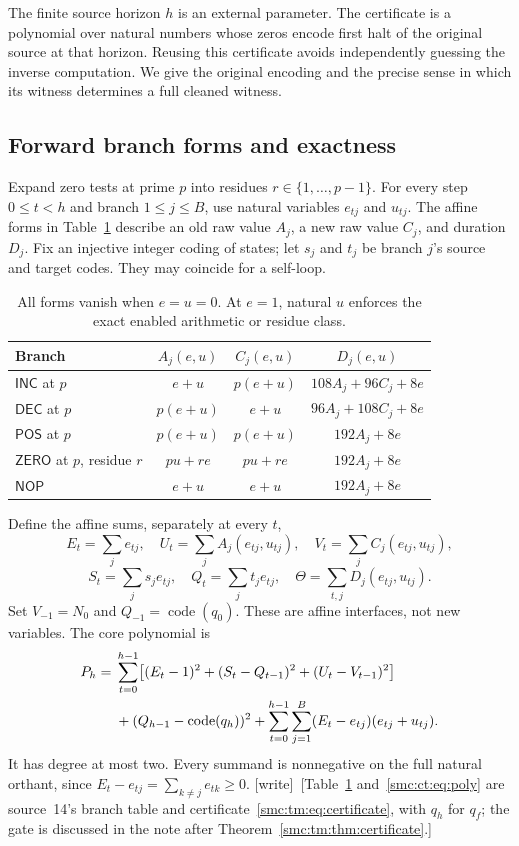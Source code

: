 \documentclass[11pt,letterpaper]{article}
\numberwithin{equation}{section}
\theoremstyle{definition}
\theoremstyle{remark}
\newcommand{\wtag}{\textup{[write]}}
\newcommand{\INC}{\mathsf{INC}}\newcommand{\DEC}{\mathsf{DEC}}\newcommand{\NOP}{\mathsf{NOP}}\newcommand{\ZERO}{\mathsf{ZERO}}\newcommand{\POS}{\mathsf{POS}}
\begin{document}
The finite source horizon $h$ is an external parameter. The certificate is a polynomial over natural numbers whose zeros encode first halt of the original source at that horizon. Reusing this certificate avoids independently guessing the inverse computation. We give the original encoding and the precise sense in which its witness determines a full cleaned witness.

\subsection{Forward branch forms and exactness}

Expand zero tests at prime $p$ into residues $r\in\{1,\ldots,p-1\}$. For every step $0\le t<h$ and branch $1\le j\le B$, use natural variables $e_{tj}$ and $u_{tj}$. The affine forms in Table~\ref{smc:ct:tab:branches} describe an old raw value $A_j$, a new raw value $C_j$, and duration $D_j$. Fix an injective integer coding of states; let $s_j$ and $t_j$ be branch $j$'s source and target codes. They may coincide for a self-loop.

\begin{table}[htbp]
\centering\small
\begin{tabular}{@{}lccc@{}}
\toprule
Branch & $A_j(e,u)$ & $C_j(e,u)$ & $D_j(e,u)$\\
\midrule
$\INC$ at $p$ & $e+u$ & $p(e+u)$ & $108A_j+96C_j+8e$\\
$\DEC$ at $p$ & $p(e+u)$ & $e+u$ & $96A_j+108C_j+8e$\\
$\POS$ at $p$ & $p(e+u)$ & $p(e+u)$ & $192A_j+8e$\\
$\ZERO$ at $p$, residue $r$ & $pu+re$ & $pu+re$ & $192A_j+8e$\\
$\NOP$ & $e+u$ & $e+u$ & $192A_j+8e$\\
\bottomrule
\end{tabular}
\caption{All forms vanish when $e=u=0$. At $e=1$, natural $u$ enforces the exact enabled arithmetic or residue class.}\label{smc:ct:tab:branches}
\end{table}

Define the affine sums, separately at every $t$,
\[
E_t=\sum_j e_{tj},\quad U_t=\sum_j A_j(e_{tj},u_{tj}),\quad
V_t=\sum_j C_j(e_{tj},u_{tj}),
\]
\[
S_t=\sum_j s_j e_{tj},\quad Q_t=\sum_j t_j e_{tj},\quad
\Theta=\sum_{t,j}D_j(e_{tj},u_{tj}).
\]
Set $V_{-1}=N_0$ and $Q_{-1}=\operatorname{code}(q_0)$. These are affine interfaces, not new variables. The core polynomial is
\begin{align}
P_h={}&\sum_{t=0}^{h-1}\bigl[(E_t-1)^2+(S_t-Q_{t-1})^2+(U_t-V_{t-1})^2\bigr]\notag\\
&+(Q_{h-1}-\operatorname{code}(q_h))^2
+\sum_{t=0}^{h-1}\sum_{j=1}^{B}(E_t-e_{tj})(e_{tj}+u_{tj}).\label{smc:ct:eq:poly}
\end{align}
It has degree at most two. Every summand is nonnegative on the full natural orthant, since $E_t-e_{tj}=\sum_{k\ne j}e_{tk}\ge0$. \wtag\ [Table~\ref{smc:ct:tab:branches} and~\eqref{smc:ct:eq:poly} are source~14's branch table and certificate~\eqref{smc:tm:eq:certificate}, with $q_h$ for $q_f$; the gate is discussed in the note after Theorem~\ref{smc:tm:thm:certificate}.]
\end{document}
